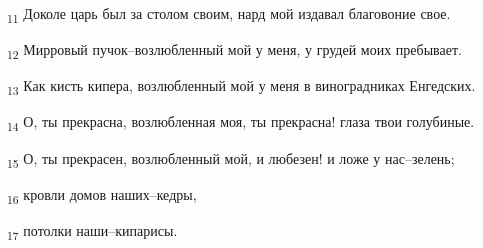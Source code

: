 \begin{tcolorbox}
\textsubscript{11} Доколе царь был за столом своим, нард мой издавал благовоние свое.
\end{tcolorbox}
\begin{tcolorbox}
\textsubscript{12} Мирровый пучок--возлюбленный мой у меня, у грудей моих пребывает.
\end{tcolorbox}
\begin{tcolorbox}
\textsubscript{13} Как кисть кипера, возлюбленный мой у меня в виноградниках Енгедских.
\end{tcolorbox}
\begin{tcolorbox}
\textsubscript{14} О, ты прекрасна, возлюбленная моя, ты прекрасна! глаза твои голубиные.
\end{tcolorbox}
\begin{tcolorbox}
\textsubscript{15} О, ты прекрасен, возлюбленный мой, и любезен! и ложе у нас--зелень;
\end{tcolorbox}
\begin{tcolorbox}
\textsubscript{16} кровли домов наших--кедры,
\end{tcolorbox}
\begin{tcolorbox}
\textsubscript{17} потолки наши--кипарисы.
\end{tcolorbox}
